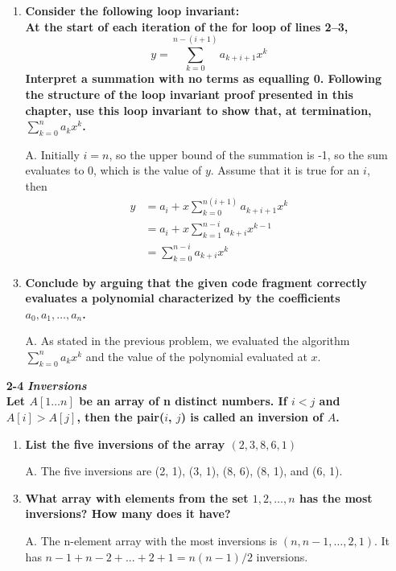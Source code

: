 \documentclass[fontsize=12pt,paper=a4,open=any]{book}
\begin{document}
\begin{enumerate}
\begin{enumerate}
		\item \textbf{Consider the following loop invariant:\\
		At the start of each iteration of the for loop of lines 2–3,
		\begin{equation*}
		y = \sum_{k=0}^{n-(i+1)} a_{k+i+1} x^k
		\end{equation*}
		Interpret a summation with no terms as equalling 0. Following the structure of the loop invariant proof presented in this chapter, use this loop invariant to show that, at termination, $\sum_{k=0}^{n} a_k x^k$.
		}
		\item[A.]
		Initially $i=n$, so the upper bound of the summation is -1, so the sum evaluates to 0, which is the value of $y$. Assume that it is true for an $i$, then 
		\begin{equation*}
			\begin{split}
				y & = a_i + x \sum_{k=0}^{n (i+1)} a_{k+i+1} x^k \\
				& = a_i + x \sum_{k=1}^{n-i} a_{k+i} x^{k-1} \\
				& = \sum_{k=0}^{n-i} a_{k+i} x^{k}
			\end{split}
		\end{equation*}
		
		\item \textbf{Conclude by arguing that the given code fragment correctly evaluates a polynomial characterized by the coefficients $a_0, a_1, \dots , a_n$.}
		\item[A.]
		As stated in the previous problem, we evaluated the algorithm $\sum_{k=0}^{n} a_k x^k$ and the value of the polynomial evaluated at $x$.		
	\end{enumerate}
	
	\item[\textbf{2-4}]
	\textbf{\textit{Inversions}\\
Let $A[1 \dots n]$ be an array of n distinct numbers. If $i < j$ and $A[i] > A[j]$, then the pair($i$, $j$) is called an inversion of $A$.}
	\begin{enumerate}
		\item \textbf{List the five inversions of the array $(2, 3, 8, 6, 1)$}
		\item[A.]
		The five inversions are (2, 1), (3, 1), (8, 6), (8, 1), and (6, 1).
		
		\item \textbf{What array with elements from the set ${1, 2,\dots,n}$ has the most inversions? How many does it have?}
		\item[A.]
		The n-element array with the most inversions is $(n, n-1, \dots , 2, 1)$. It has $n-1+n-2+...+2+1 = n(n-1)/2$ inversions.
		

\end{enumerate}
\end{enumerate}
\end{document}
